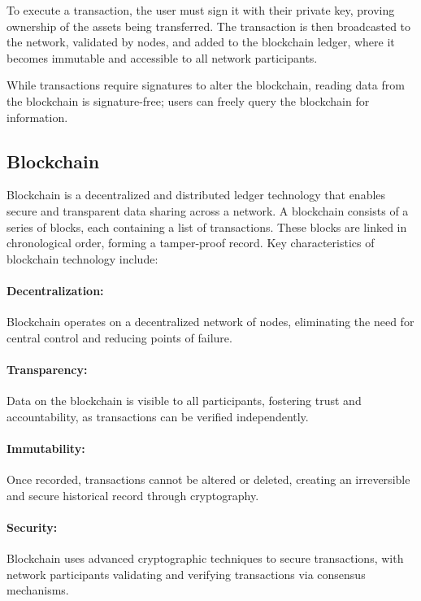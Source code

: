 To execute a transaction, the user must sign it with their private key, proving
ownership of the assets being transferred. The transaction is then broadcasted
to the network, validated by nodes, and added to the blockchain ledger, where
it becomes immutable and accessible to all network participants.

While transactions require signatures to alter the blockchain, reading data
from the blockchain is signature-free; users can freely query the blockchain
for information.

\subsection{Blockchain}
\label{subsec:blockchain}

Blockchain is a decentralized and distributed ledger technology that enables
secure and transparent data sharing across a network. A blockchain consists of
a series of blocks, each containing a list of transactions. These blocks are
linked in chronological order, forming a tamper-proof record. Key
characteristics of blockchain technology include:

\paragraph{Decentralization:}
Blockchain operates on a decentralized network of nodes, eliminating the need
for central control and reducing points of failure.

\paragraph{Transparency:}
Data on the blockchain is visible to all participants, fostering trust and
accountability, as transactions can be verified independently.

\paragraph{Immutability:}
Once recorded, transactions cannot be altered or deleted, creating an
irreversible and secure historical record through cryptography.

\paragraph{Security:}
Blockchain uses advanced cryptographic techniques to secure transactions, with
network participants validating and verifying transactions via consensus
mechanisms.

